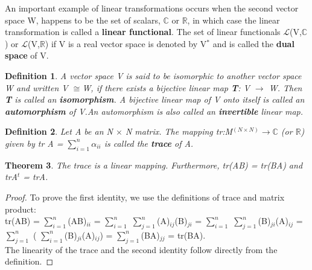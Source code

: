 \documentclass[12pt,a4paper]{article}
\newtheorem{thm}{Theorem}
\newtheorem{defn}[thm]{Definition}
\begin{document}
An important example of linear transformations occurs when the second vector space W, happens to be the set of scalars, $\mathbb{C}$ or $\mathbb{R}$, in which case the linear transformation is called a \textbf{linear functional}. The set of linear functionals $\mathcal{L}$(V,$\mathbb{C}$) or $\mathcal{L}$(V,$\mathbb{R}$) if V is a real vector space is denoted by V$^*$ and is called the \textbf{dual space} of V.
\begin{defn}
A vector space V is said to be isomorphic to another vector space W and written V ${\cong}$W, if there exists a bijective linear map \textbf{T}:
V $\to$ W. Then \textbf{T} is called an \textbf{isomorphism}. A bijective linear map of V onto itself is called an \textbf{automorphism} of V.An automorphism is also called an \textbf{invertible} linear map. 
\end{defn}
\begin{defn}
Let A be an N $\times$ N matrix. The mapping tr:M$^{(N\times N)}$$\to$$\mathbb{C}$ (or $\mathbb{R}$) given by tr A = $\sum_{i=1}^{n}$$ \alpha_{ii} $ is called the \textbf{trace} of A.
\end{defn}
\begin{thm}
The trace is a linear mapping. Furthermore, tr(AB) = tr(BA) and trA$^t$ = trA.
\end{thm}
\begin{proof}
To prove the first identity, we use the definitions of trace and matrix product:\\
tr(AB) = $\sum_{i=1}^{n}$(AB)$_{ii} $ = $\sum_{i=1}^{n}$ $\sum_{j=1}^{n}$(A)$_{ij}$(B)$_{ji}$ =  $\sum_{i=1}^{n}$ $\sum_{j=1}^{n}$(B)$_{ji}$(A)$_{ij}$ = $\sum_{j=1}^{n}$ ( $\sum_{i=1}^{n}$(B)$_{ji}$(A)$_{ij}$) = $\sum_{j=1}^{n}$(BA)$_{jj}$ = tr(BA).\\
The linearity of the trace and the second identity follow directly from the definition.
\end{proof}
\end{document}
